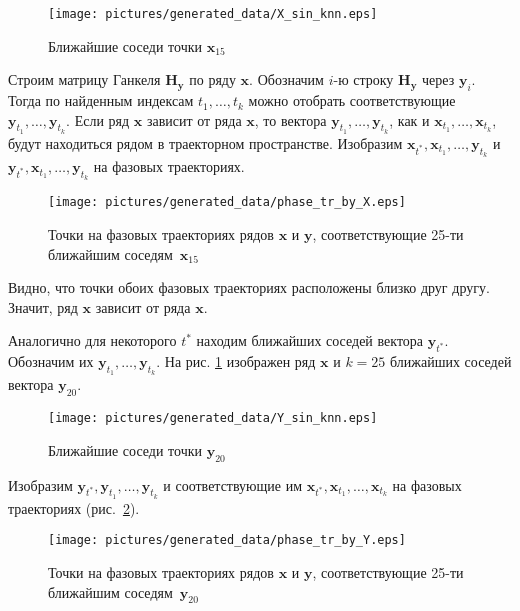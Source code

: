 \documentclass[14pt]{article}
\newcommand{\bH}{\mathbf{H}}
\newcommand{\bx}{\mathbf{x}}
\newcommand{\by}{\mathbf{y}}
\begin{document}
\begin{figure}[H]
\begin{center}
\texttt{[image: pictures/generated\_data/X\_sin\_knn.eps]}
\end{center}
\vspace{-5mm}
\caption{Ближайшие соседи точки $\bx_{15}$}
\end{figure}

Строим матрицу Ганкеля $\bH_{\by}$ по ряду $\bx$. 
Обозначим $i$-ю строку $\bH_{\by}$ через $\by_{i}$. Тогда по найденным индексам $t_1, \ldots, t_{k}$ можно отобрать соответствующие $\by_{t_1}, \ldots, \by_{t_{k}}$. Если ряд $\bx$ зависит от ряда $\bx$, то вектора $\by_{t_1}, \ldots, \by_{t_{k}}$, как и $\bx_{t_1}, \ldots, \bx_{t_{k}}$,  будут находиться рядом в траекторном пространстве.
Изобразим $\bx_{t^*}, \bx_{t_1}, \ldots, \by_{t_{k}}$ и $\by_{t^*}, \bx_{t_1}, \ldots, \by_{t_{k}}$ на фазовых траекториях. 

\begin{figure}[H]
\begin{center}
\texttt{[image: pictures/generated\_data/phase\_tr\_by\_X.eps]}
\end{center}
\vspace{-3mm}
\caption{Точки на фазовых траекториях  рядов $\bx$ и $\by$, соответствующие 25-ти ближайшим соседям~$\bx_{15}$}
\end{figure}

Видно, что точки обоих фазовых траекториях расположены близко друг другу. Значит, ряд $\bx$ зависит от ряда $\bx$.

Аналогично для некоторого $t^*$ находим ближайших соседей вектора $\by_{t^*}$. Обозначим их $\by_{t_1}, \ldots, \by_{t_k}$. На рис. \ref{sin_y_knn} изображен ряд $\bx$ и $k = 25$ ближайших соседей вектора $\by_{20}$. 

\begin{figure}
\begin{center}
\texttt{[image: pictures/generated\_data/Y\_sin\_knn.eps]}
\caption{Ближайшие соседи точки $\by_{20}$}
\label{sin_y_knn}
\end{center}
\end{figure}

Изобразим $\by_{t^*}, \by_{t_1}, \ldots, \by_{t_{k}}$ и соответствующие им $\bx_{t^*}, \bx_{t_1}, \ldots, \bx_{t_{k}}$ на фазовых траекториях \mbox{(рис. \ref{phase_tr_by_Y})}. 


\begin{figure}[H]
\begin{center}
\texttt{[image: pictures/generated\_data/phase\_tr\_by\_Y.eps]}
\caption{Точки на фазовых траекториях  рядов $\bx$ и $\by$, соответствующие 25-ти ближайшим соседям~$\by_{20}$}
\label{phase_tr_by_Y}
\end{center}
\end{figure}
\end{document}
